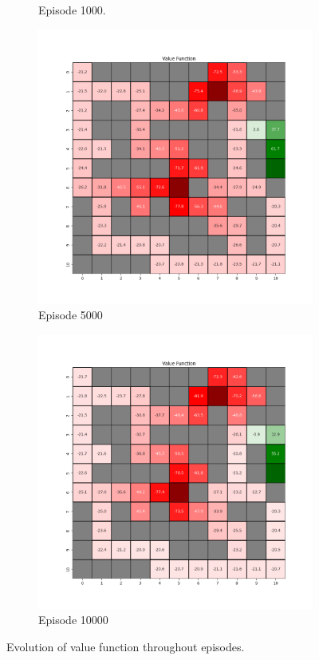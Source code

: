 \documentclass{assignment}
\begin{document}
\begin{figure}[H]
\begin{subfigure}{0.3\textwidth}
    \caption{Episode 1000.}
    \end{subfigure}\hfill
    \begin{subfigure}{0.3\textwidth}
        \includegraphics[width=\textwidth]{figures/value_td/epsilon_sweep/value_function_alpha_0.1_gamma_0.95_epsilon_1.0_iteration_5000.png}
    \caption{Episode 5000}
    \end{subfigure}\hfill
    \begin{subfigure}{0.3\textwidth}
        \includegraphics[width=\textwidth]{figures/value_td/epsilon_sweep/value_function_alpha_0.1_gamma_0.95_epsilon_1.0_iteration_10000.png}
    \caption{Episode 10000}
    \end{subfigure}
    \caption{Evolution of value function throughout episodes.}
    \label{fig:epsilon_1.0_td_learning_value}
\end{figure}
\end{document}
